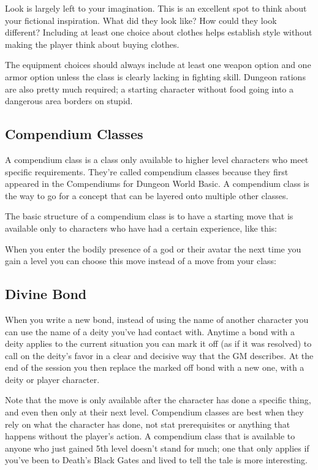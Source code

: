 Look is largely left to your imagination. This is an excellent spot to think about your fictional inspiration. What did they look like? How could they look different? Including at least one choice about clothes helps establish style without making the player think about buying clothes.


The equipment choices should always include at least one weapon option and one armor option unless the class is clearly lacking in fighting skill. Dungeon rations are also pretty much required; a starting character without food going into a dangerous area borders on stupid.
\subsection{Compendium Classes}


A compendium class is a class only available to higher level characters who meet specific requirements. They're called compendium classes because they first appeared in the Compendiums for Dungeon World Basic. A compendium class is the way to go for a concept that can be layered onto multiple other classes.


The basic structure of a compendium class is to have a starting move that is available only to characters who have had a certain experience, like this:


When you enter the bodily presence of a god or their avatar the next time you gain a level you can choose this move instead of a move from your class:
\subsection{Divine Bond}


When you write a new bond, instead of using the name of another character you can use the name of a deity you've had contact with. Anytime a bond with a deity applies to the current situation you can mark it off (as if it was resolved) to call on the deity's favor in a clear and decisive way that the GM describes. At the end of the session you then replace the marked off bond with a new one, with a deity or player character.


Note that the move is only available after the character has done a specific thing, and even then only at their next level. Compendium classes are best when they rely on what the character has done, not stat prerequisites or anything that happens without the player's action. A compendium class that is available to anyone who just gained 5th level doesn't stand for much; one that only applies if you've been to Death's Black Gates and lived to tell the tale is more interesting.


